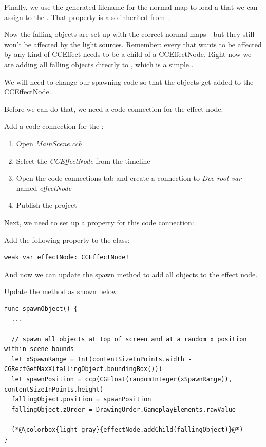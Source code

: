 Finally, we use the generated filename for the normal map to load a
 that we can assign to the . That property is also inherited
from .

Now the falling objects are set up with the correct normal maps - but they still
won't be affected by the light sources. Remember: every \ccsprite{} that wants
to be affected by any kind of CCEffect needs to be a child of a CCEffectNode.
Right now we are adding all falling objects directly to ,
which is a simple \ccnode{}.

We will need to change our spawning code so that the objects get added to the
CCEffectNode. 

Before we can do that, we need a code connection for the effect node.

\begin{leftbar}
Add a code connection for the :
\begin{enumerate}
  \item Open \textit{MainScene.ccb}
  \item Select the \textit{CCEffectNode} from the timeline
  \item Open the code connections tab and create a connection to \textit{Doc
  root var} named \textit{effectNode}
  \item Publish the \SB{} project
\end{enumerate}
\end{leftbar}

Next, we need to set up a property for this code connection:
\begin{leftbar}
Add the following property to the  class:
\begin{lstlisting}
weak var effectNode: CCEffectNode!
\end{lstlisting}
\end{leftbar}

And now we can update the spawn method to add all objects to the effect node.

\begin{leftbar}
Update the  method as shown below:
\begin{lstlisting}
func spawnObject() {
  ...
  
  // spawn all objects at top of screen and at a random x position within scene bounds
  let xSpawnRange = Int(contentSizeInPoints.width - CGRectGetMaxX(fallingObject.boundingBox()))
  let spawnPosition = ccp(CGFloat(randomInteger(xSpawnRange)), contentSizeInPoints.height)
  fallingObject.position = spawnPosition
  fallingObject.zOrder = DrawingOrder.GameplayElements.rawValue
  
  (*@\colorbox{light-gray}{effectNode.addChild(fallingObject)}@*)
}
\end{lstlisting}
\end{leftbar}

